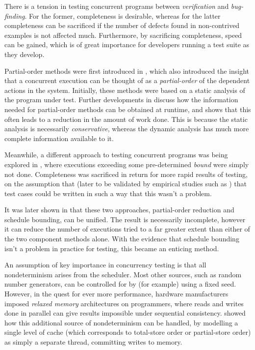 
There is a tension in testing concurrent programs between
\emph{verification} and \emph{bug-finding}. For the former,
completeness is desirable, whereas for the latter completeness can be
sacrificed if the number of defects found in non-contrived examples is
not affected much. Furthermore, by sacrificing completeness, speed can
be gained, which is of great importance for developers running a test
suite as they develop.


Partial-order methods were first introduced in \citep{por}, which also
introduced the insight that a concurrent execution can be thought of
as a \emph{partial-order} of the dependent actions in the
system. Initially, these methods were based on a static analysis of
the program under test. Further developments in \citep{dpor} discuss
how the information needed for partial-order methods can be obtained
at runtime, and shows that this often leads to a reduction in the
amount of work done. This is because the static analysis is
necessarily \emph{conservative}, whereas the dynamic analysis has much
more complete information available to it.

Meanwhile, a different approach to testing concurrent programs was
being explored in \citep{pbound}, where executions exceeding some
pre-determined \emph{bound} were simply not done. Completeness was
sacrificed in return for more rapid results of testing, on the
assumption that (later to be validated by empirical studies such as
\citep{empirical}) that test cases could be written in such a way that
this wasn't a problem.

It was later shown in \citep{bpor} that these two approaches,
partial-order reduction and schedule bounding, can be unified. The
result is necessarily incomplete, however it can reduce the number of
executions tried to a far greater extent than either of the two
component methods alone. With the evidence that schedule bounding
isn't a problem in practice for testing, this became an enticing
method.

An assumption of key importance in concurrency testing is that all
nondeterminism arises from the scheduler. Most other sources, such as
random number generators, can be controlled for by (for example) using
a fixed seed. However, in the quest for ever more performance,
hardware manufacturers imposed \emph{relaxed memory} architectures on
programmers, where reads and writes done in parallel can give results
impossible under sequential consistency. \citep{rdpor} showed how this
additional source of nondeterminism can be handled, by modelling a
single level of cache (which corresponds to total-store order or
partial-store order) as simply a separate thread, committing writes to
memory.

